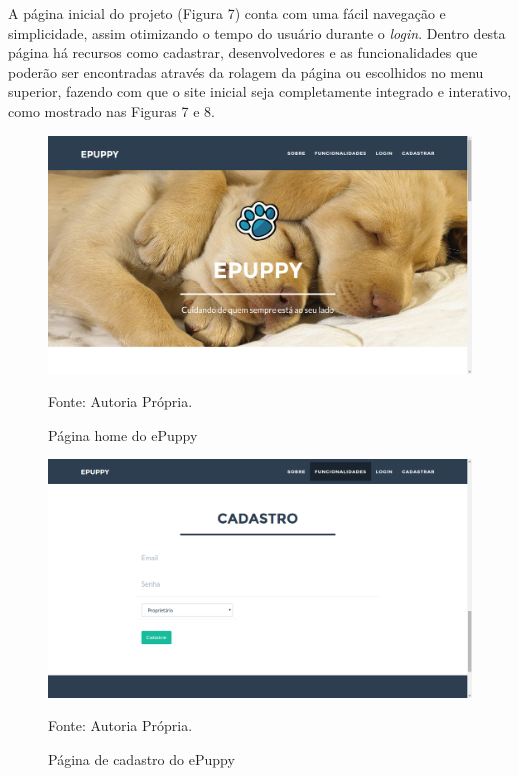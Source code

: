 A página inicial do projeto (Figura 7) conta com uma fácil navegação e simplicidade, assim otimizando o tempo do usuário durante o {\it login}. Dentro desta página há recursos como cadastrar, desenvolvedores e as funcionalidades que poderão ser encontradas através da rolagem da página ou escolhidos no menu superior, fazendo com que o site inicial seja completamente integrado e interativo, como mostrado nas Figuras 7 e 8.
\begin{figure}[h!]
	\center	\includegraphics[scale=0.25
	]{imagens/principal}
	\caption{Página home do ePuppy}
	Fonte: Autoria Própria.
	\label{Rotulo}
\end{figure}
\begin{figure}[h!]
	\center	\includegraphics[scale=0.25
	]{imagens/cadastro}
	\caption{Página de cadastro do ePuppy}
	Fonte: Autoria Própria.
	\label{Rotulo}
\end{figure}

\newpage

